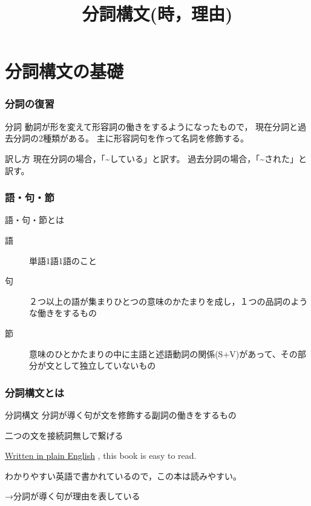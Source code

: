 \documentclass[xcolor=dvipsnames,unicode,14pt]{beamer}%
\title{分詞構文(時，理由)}
\begin{document}
\frame{\maketitle}

\begin{frame}
  \tableofcontents
\end{frame}
\section{分詞構文の基礎}
\begin{frame}
  \frametitle{分詞の復習}
  \begin{block}{分詞}
    動詞が形を変えて形容詞の働きをするようになったもので，
    現在分詞と過去分詞の2種類がある。
    主に形容詞句を作って名詞を修飾する。
  \end{block}
  \begin{block}{訳し方}
    現在分詞の場合，「\textasciitilde している」と訳す。
    過去分詞の場合，「\textasciitilde された」と訳す。
  \end{block}
\end{frame}

\begin{frame}
  \frametitle{語・句・節}
  語・句・節とは
  \pause
  \begin{description}
    \item[語] 単語1語1語のこと
    \item[句] ２つ以上の語が集まりひとつの意味のかたまりを成し，１つの品詞のような働きをするもの
    \item[節] 意味のひとかたまりの中に主語と述語動詞の関係(S+V)があって、その部分が文として独立していないもの
  \end{description}
  \pause

\end{frame}
\begin{frame}
  \frametitle{分詞構文とは}

  \begin{block}{分詞構文}
    分詞が導く句が文を修飾する副詞の働きをするもの

    二つの文を接続詞無しで繋げる
  \end{block} 
  \textcolor{NavyBlue}{\underline{Written \textcolor{black}{in plain English}}} , this book is easy to read. 

  わかりやすい英語で書かれているので，この本は読みやすい。

  →分詞が導く句が理由を表している

\end{frame}
\end{document}

